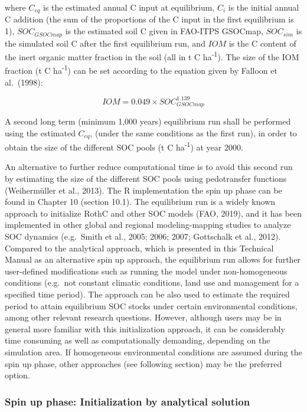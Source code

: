 \documentclass[
  10pt,
  b5paper,
]{book}
\begin{document}
where \(C_{eq}\) is the estimated annual C input at equilibrium, \(C_i\) is the initial annual C addition (the sum of the proportions of the C input in the first equilibrium is 1), \(SOC_{GSOCmap}\) is the estimated soil C given in FAO-ITPS GSOCmap, \(SOC_{sim}\) is the simulated soil C after the first equilibrium run, and \(IOM\) is the C content of the inert organic matter fraction in the soil (all in t C ha\textsuperscript{-1}). The size of the IOM fraction (t C ha\textsuperscript{-1}) can be set according to the equation given by Falloon et al.~(1998):

\begin{equation}
\tag{5.2}
IOM=0.049 \times SOC_{GSOCmap}^{1.139} 
\end{equation}

A second long term (minimum 1,000 years) equilibrium run shall be performed using the estimated \(C_{eq}\), (under the same conditions as the first run), in order to obtain the size of the different SOC pools (t C ha\textsuperscript{-1}) at year 2000.

An alternative to further reduce computational time is to avoid this second run by estimating the size of the different SOC pools using pedotransfer functions (Weihermüller et al., 2013). The R implementation the spin up phase can be found in Chapter 10 (section 10.1).
The equilibrium run is a widely known approach to initialize RothC and other SOC models (FAO, 2019), and it has been implemented in other global and regional modeling-mapping studies to analyze SOC dynamics (e.g.~Smith et al., 2005; 2006; 2007; Gottschalk et al., 2012).\\
Compared to the analytical approach, which is presented in this Technical Manual as an alternative spin up approach, the equilibrium run allows for further user-defined modifications such as running the model under non-homogeneous conditions (e.g.~not constant climatic conditions, land use and management for a specified time period). The approach can be also used to estimate the required period to attain equilibrium SOC stocks under certain environmental conditions, among other relevant research questions. However, although users may be in general more familiar with this initialization approach, it can be considerably time consuming as well as computationally demanding, depending on the simulation area. If homogeneous environmental conditions are assumed during the spin up phase, other approaches (see following section) may be the preferred option.

\hypertarget{spin-up-phase-initialization-by-analytical-solution}{%
\subsubsection{Spin up phase: Initialization by analytical solution}\label{spin-up-phase-initialization-by-analytical-solution}}
\end{document}
